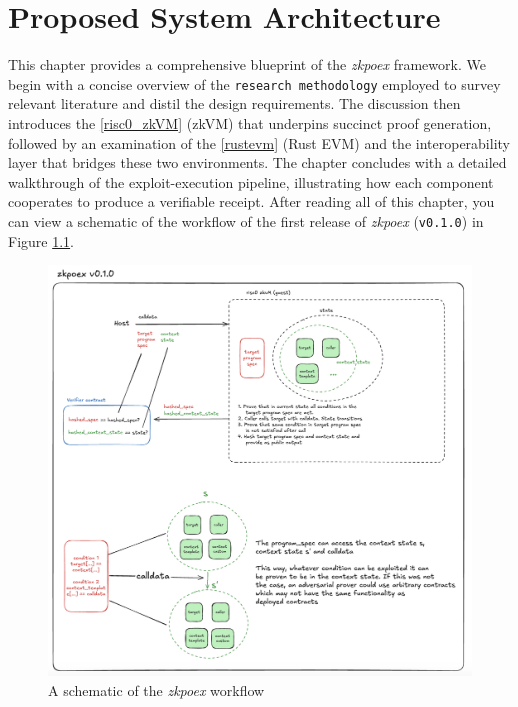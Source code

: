 \chapter{Proposed System Architecture}\makeatletter{}\makeatother
\label{chap2}
 This chapter provides a comprehensive blueprint of the \textit{zkpoex} framework.  
We begin with a concise overview of the \texttt{research methodology} employed to survey relevant literature and distil the design requirements.  The discussion then introduces the \ref{risc0_zkVM} (zkVM) that underpins succinct proof generation, followed by an examination of the \ref{rustevm} (Rust EVM) and the interoperability layer that bridges these two environments.  The chapter concludes with a detailed walkthrough of the exploit-execution pipeline, illustrating how each component cooperates to produce a verifiable receipt. After reading all of this chapter, you can view a schematic of the workflow of the first release of \textit{zkpoex} (\texttt{v0.1.0}) in Figure \ref{fig:zkpoexSchem}.

\begin{figure}[h]
    \centering
    \includegraphics[width=1\linewidth]{Images/Chap2/zkpoex-v0.1.0.png}
    \caption{A schematic of the \textit{zkpoex} workflow \cite{zkpoex_docs}}
    \label{fig:zkpoexSchem}
\end{figure}

